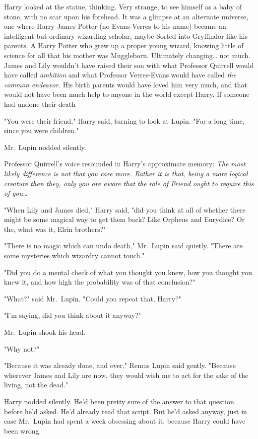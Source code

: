 Harry looked at the statue, thinking. Very strange, to see himself as a baby of 
stone, with no scar upon his forehead. It was a glimpse at an alternate 
universe, one where Harry James Potter (no Evans-Verres to his name) became an 
intelligent but ordinary wizarding scholar, maybe Sorted into Gryffindor like 
his parents. A Harry Potter who grew up a proper young wizard, knowing little 
of science for all that his mother was Muggleborn. Ultimately changing{\ldots} 
not much. James and Lily wouldn't have raised their son with what Professor 
Quirrell would have called \emph{ambition} and what Professor Verres-Evans 
would have called \emph{the common endeavor.} His birth parents would have 
loved him very much, and that would not have been much help to anyone in the 
world except Harry. If someone had undone their death---

"You were their friend," Harry said, turning to look at Lupin. "For a long 
time, since you were children."

Mr.~Lupin nodded silently.

Professor Quirrell's voice resounded in Harry's approximate memory: \emph{The 
most likely difference is not that you care more. Rather it is that, being a 
more logical creature than they, only you are aware that the role of Friend 
ought to require this of you{\ldots}}

"When Lily and James died," Harry said, "did you think at all of whether there 
might be some magical way to get them back? Like Orpheus and Eurydice? Or the, 
what was it, Elrin brothers?"

"There is no magic which can undo death," Mr.~Lupin said quietly. "There are 
some mysteries which wizardry cannot touch."

"Did you do a mental check of what you thought you knew, how you thought you 
knew it, and how high the probability was of that conclusion?"

"What?" said Mr.~Lupin. "Could you repeat that, Harry?"

"I'm saying, did you think about it anyway?"

Mr.~Lupin shook his head.

"Why not?"

"Because it was already done, and over," Remus Lupin said gently. "Because 
wherever James and Lily are now, they would wish me to act for the sake of the 
living, not the dead."

Harry nodded silently. He'd been pretty sure of the answer to that question 
before he'd asked. He'd already read that script. But he'd asked anyway, just 
in case Mr.~Lupin had spent a week obsessing about it, because Harry could have 
been wrong.

